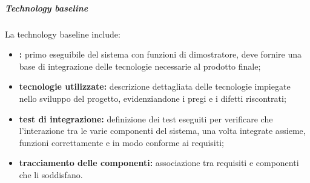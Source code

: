 					\subparagraph{Technology baseline}
						La technology baseline include:
						\begin{itemize}
							\item \textbf{:} primo eseguibile del sistema con funzioni di dimostratore, deve fornire una base di integrazione delle tecnologie necessarie al prodotto finale;
							\item \textbf{tecnologie utilizzate:} descrizione dettagliata delle tecnologie impiegate nello sviluppo del progetto, evidenziandone i pregi e i difetti riscontrati;
							\item \textbf{test di integrazione:} definizione dei test eseguiti per verificare che l'interazione tra le varie componenti del sistema, una volta integrate assieme, funzioni correttamente e in modo conforme ai requisiti;
							\item \textbf{tracciamento delle componenti:} associazione tra requisiti e componenti che li soddisfano.
						\end{itemize}

